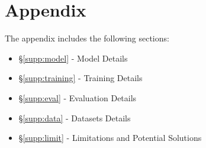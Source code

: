 \appendix

\section*{Appendix}
The appendix includes the following sections:
\begin{itemize}
\itemsep0em
    \item \S\ref{supp:model} - Model Details
    \item \S\ref{supp:training} - Training Details
    \item \S\ref{supp:eval} - Evaluation Details
    \item \S\ref{supp:data} - Datasets Details
    \item \S\ref{supp:limit} - Limitations and Potential Solutions

\end{itemize}


\clearpage


\clearpage



\clearpage


\clearpage

% 



